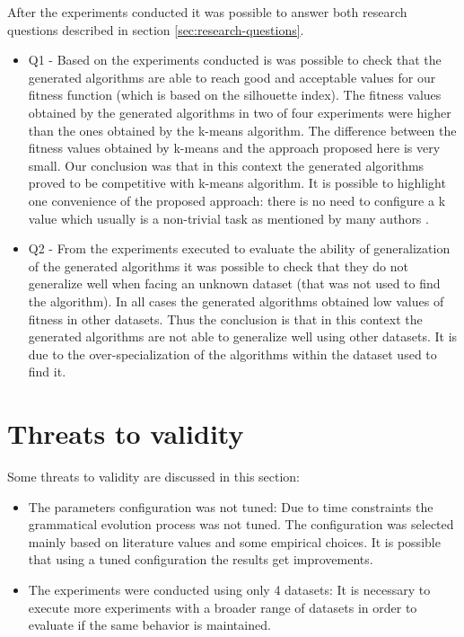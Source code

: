 \documentclass[journal]{IEEEtran}
\begin{document}
After the experiments conducted it was possible to answer both research questions described in section \ref{sec:research-questions}.
\begin{itemize}
	\item Q1 - Based on the experiments conducted is was possible to check that the generated algorithms are able to reach good and acceptable values for our fitness function (which is based on the silhouette index). The fitness values obtained by the generated algorithms in two of four experiments were higher than the ones obtained by the k-means algorithm. The difference between the fitness values obtained by k-means and the approach proposed here is very small. Our conclusion was that in this context the generated algorithms proved to be competitive with k-means algorithm. It is possible to highlight one convenience of the proposed approach: there is no need to configure a k value which usually is a non-trivial task as mentioned by many authors \cite{pham2005selection, yan2005methods, tibshirani2001estimating}.
	\item Q2 - From the experiments executed to evaluate the ability of generalization of the generated algorithms it was possible to check that they do not generalize well when facing an unknown dataset (that was not used to find the algorithm). In all cases the generated algorithms obtained low values of fitness in other datasets. Thus the conclusion is that in this context the generated algorithms are not able to generalize well using other datasets. It is due to the over-specialization of the algorithms within the dataset used to find it.
\end{itemize}


\section{Threats to validity}

Some threats to validity are discussed in this section:
\begin{itemize}
	\item The parameters configuration was not tuned: Due to time constraints the grammatical evolution process was not tuned. The configuration was selected mainly based on literature values and some empirical choices. It is possible that using a tuned configuration the results get improvements.
	\item The experiments were conducted using only 4 datasets: It is necessary to execute more experiments with a broader range of datasets in order to evaluate if the same behavior is maintained.
\end{itemize}




\end{document}
